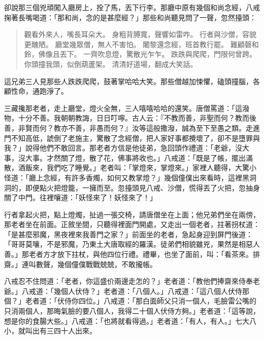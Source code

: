 卻說那三個兇頑闖入廳房上，拴了馬，丟下行李。那廳中原有幾個和尚念經，八戒掬著長嘴喝道：「那和尚，念的是甚麼經？」那些和尚聽見問了一聲，忽然擡頭：
\begin{quote}
觀看外來人，嘴長耳朵大。
身粗背膊寬，聲響如雷咋。
行者與沙僧，容貌更醜陋。
廳堂幾眾僧，無人不害怕。
闍黎還念經，班首教行罷。
難顧磬和鈴，佛像且丟下。
一齊吹息燈，驚散光乍乍。
跌跌與爬爬，門限何曾跨。
你頭撞我頭，似倒葫蘆架。
清清好道場，翻成大笑話。
\end{quote}

這兄弟三人見那些人跌跌爬爬，鼓著掌哈哈大笑。那些僧越加悚懼，磕頭撞腦，各顧性命，通跑淨了。

三藏攙那老者，走上廳堂，燈火全無，三人嘻嘻哈哈的還笑。唐僧罵道：「這潑物，十分不善。我朝朝教誨，日日叮嚀。古人云：『不教而善，非聖而何？教而後善，非賢而何？教亦不善，非愚而何？』汝等這般撒潑，誠為至下至愚之類。走進門不知高低，諕倒了老施主，驚散了念經僧，把人家好事都攪壞了，卻不是墮罪與我？」說得他們不敢回言。那老者方信是他徒弟，急回頭作禮道：「老爺，沒大事，沒大事。才然關了燈，散了花，佛事將收也。」八戒道：「既是了帳，擺出滿散，酒飯來，我們吃了睡覺。」老者叫：「掌燈來，掌燈來。」家裡人聽得，大驚小怪道：「廳上念經，有許多香燭，如何又教掌燈？」幾個僮僕出來看時，這裡黑洞洞的，即便點火把燈籠，一擁而至。忽擡頭見八戒、沙僧，慌得丟了火把，忽抽身關了中門。往裡嚷道：「妖怪來了！妖怪來了！」

行者拿起火把，點上燈燭，扯過一張交椅，請唐僧坐在上面；他兄弟們坐在兩傍，那老者坐在前面。正敘坐間，只聽得裡面門開處，又走出一個老者，拄著拐杖道：「是甚麼邪魔，黑夜裡來我善門之家？」前面坐的老者，急起身迎到屏門後道：「哥哥莫嚷，不是邪魔，乃東土大唐取經的羅漢。徒弟們相貌雖兇，果然是相惡人善。」那老者方才放下拄杖，與他四位行禮。禮畢，也坐了面前，叫：「看茶來。排齋。」連叫數聲，幾個僮僕戰戰兢兢，不敢攏帳。

八戒忍不住問道：「老者，你這盛价兩邊走怎的？」老者道：「教他們捧齋來侍奉老爺。」八戒道：「幾個人伏侍？」老者道：「八個人。」八戒道：「這八個人伏侍那個？」老者道：「伏侍你四位。」八戒道：「那白面師父只消一個人，毛臉雷公嘴的只消兩個人，那晦氣臉的要八個人，我得二十個人伏侍方夠。」老者道：「這等說，想是你的食腸大些。」八戒道：「也將就看得過。」老者道：「有人，有人。」七大八小，就叫出有三四十人出來。

